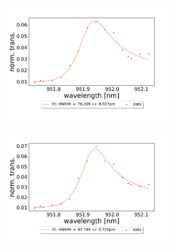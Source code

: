 \begin{figure}[h!]
\begin{subfigure}[b]{0.49\textwidth}
        \includegraphics[width=\textwidth]{figures/results/double fano fits/20250326/251um_M3:M5_fit_3.pdf}
        \caption{}
        \label{fig:251um_M3:M5_fit_3}
    \end{subfigure}
    \begin{subfigure}[b]{0.49\textwidth}
        \includegraphics[width=\textwidth]{figures/results/double fano fits/20250326/251um_M3:M5_fit_4.pdf}
        \caption{}
        \label{fig:251um_M3:M5_fit_4}
    \end{subfigure}
    \begin{subfigure}[b]{0.49\textwidth}

\end{subfigure}
\end{figure}

